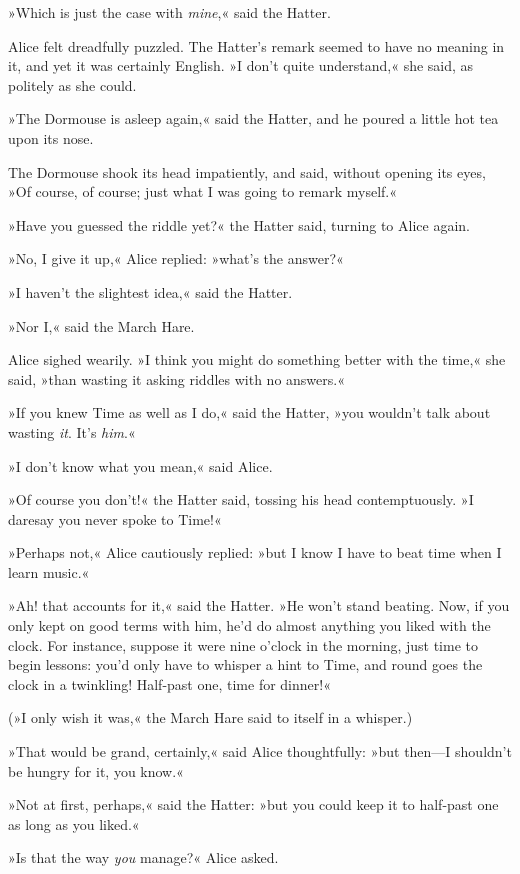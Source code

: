 »Which is just the case with \textit{mine},« said the Hatter.

Alice felt dreadfully puzzled. The Hatter's remark seemed to have no meaning in it, and yet it was certainly English. »I don't quite understand,« she said, as politely as she could.

»The Dormouse is asleep again,« said the Hatter, and he poured a little hot tea upon its nose.

The Dormouse shook its head impatiently, and said, without opening its eyes, »Of course, of course; just what I was going to remark myself.«

»Have you guessed the riddle yet?« the Hatter said, turning to Alice again.

»No, I give it up,« Alice replied: »what's the answer?«

»I haven't the slightest idea,« said the Hatter.

»Nor I,« said the March Hare.

Alice sighed wearily. »I think you might do something better with the time,« she said, »than wasting it asking riddles with no answers.«

»If you knew Time as well as I do,« said the Hatter, »you wouldn't talk about wasting \textit{it}. It's \textit{him}.«

»I don't know what you mean,« said Alice.

»Of course you don't!« the Hatter said, tossing his head contemptuously. »I daresay you never spoke to Time!«

»Perhaps not,« Alice cautiously replied: »but I know I have to beat time when I learn music.«

»Ah! that accounts for it,« said the Hatter. »He won't stand beating. Now, if you only kept on good terms with him, he'd do almost anything you liked with the clock. For instance, suppose it were nine o'clock in the morning, just time to begin lessons: you'd only have to whisper a hint to Time, and round goes the clock in a twinkling! Half-past one, time for dinner!«

(»I only wish it was,« the March Hare said to itself in a whisper.)

»That would be grand, certainly,« said Alice thoughtfully: »but then—I shouldn't be hungry for it, you know.«

»Not at first, perhaps,« said the Hatter: »but you could keep it to half-past one as long as you liked.«

»Is that the way \textit{you} manage?« Alice asked.

